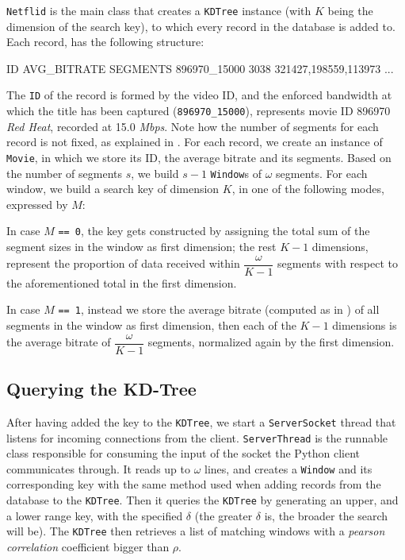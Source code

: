 \texttt{Netflid} is the main class that creates a \texttt{KDTree} instance
(with $K$ being the dimension of the search key), to which every record in the
database is added to. Each record, has the following structure:

\begin{bash_script} 
ID              AVG_BITRATE  SEGMENTS
896970_15000    3038         321427,198559,113973 ...
\end{bash_script}

The \texttt{ID} of the record is formed by the video ID, and the
enforced bandwidth at which the title has been captured
(\texttt{896970\_15000}), represents movie ID 896970 \emph {Red Heat},
recorded at 15.0 \emph{Mbps}. Note how the number of segments for each
record is not fixed, as explained in .  For each
record, we create an instance of \texttt{Movie}, in which we store its
ID, the average bitrate and its segments. Based on the number of
segments $s$, we build $s-1$ \texttt{Window}s of $\omega$ segments.
For each window, we build a search key of dimension $K$, in one of the
following modes, expressed by $M$: 

In case $M$ \texttt{== 0}, the key gets constructed by assigning the
total sum of the segment sizes in the window as first dimension; the
rest $K - 1$ dimensions, represent the proportion of data received
within $\dfrac{\omega}{K-1}$ segments with respect to the
aforementioned total in the first dimension.

In case $M$ \texttt{== 1}, instead we store the average bitrate
(computed as in ) of all segments in the window as
first dimension, then each of the $K-1$ dimensions is the average
bitrate of $\dfrac{\omega}{K-1}$ segments, normalized again by the
first dimension.

\subsection{Querying the KD-Tree}

After having added the key to the \texttt{KDTree}, we start a
\texttt{ServerSocket} thread that listens for incoming connections from the
client. \texttt{ServerThread} is the runnable class responsible for consuming
the input of the socket the Python client communicates through. It reads up to
$\omega$ lines, and creates a \texttt{Window} and its corresponding key with
the same method used when adding records from the database to the
\texttt{KDTree}. Then it queries the \texttt{KDTree} by generating an upper,
and a lower range key, with the specified $\delta$ (the greater $\delta$ is,
the broader the search will be). The \texttt{KDTree} then retrieves a list of
matching windows with a \emph{pearson correlation} coefficient bigger than
$\rho$.

